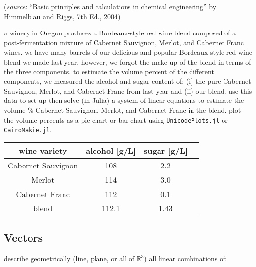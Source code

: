 \documentclass[addpoints]{exam}
\begin{document}
\begin{questions}
	 
	
	(\emph{source}: ``Basic principles and calculations in chemical engineering'' by Himmelblau and Riggs, 7th Ed., 2004)
	
	
	 \question a winery in Oregon produces a Bordeaux-style red wine blend composed of a post-fermentation mixture of Cabernet Sauvignon, Merlot, and Cabernet Franc wines. 
	 we have many barrels of our delicious and popular Bordeaux-style red wine blend we made last year.
	 however, we forgot the make-up of the blend in terms of the three components.
	to estimate the volume percent of the different components, we measured the alcohol and sugar content of: (i) the pure Cabernet Sauvignon, Merlot, and Cabernet Franc from last year and (ii) our blend. use this data to set up then solve (in Julia) a system of linear equations to estimate the volume \% Cabernet Sauvignon, Merlot, and Cabernet Franc in the blend. plot the volume percents as a pie chart or bar chart using \texttt{UnicodePlots.jl} or \texttt{CairoMakie.jl}.
	  
	 \begin{table}[h!]
	 \centering
	  \begin{tabular}{c c c c }
		\hline
		wine variety & alcohol [g/L] & sugar [g/L]  \\
		\hline
		Cabernet Sauvignon &  108 & 2.2 \\
		Merlot &  114 & 3.0 \\
		Cabernet Franc & 112 & 0.1 \\
		\hline
		blend & 112.1 & 1.43 
	\end{tabular}
	\end{table}
	
	\subsection*{Vectors}
	\question describe geometrically (line, plane, or all of $\mathbb{R}^3$) all linear combinations of:
\end{questions}
\end{document}
